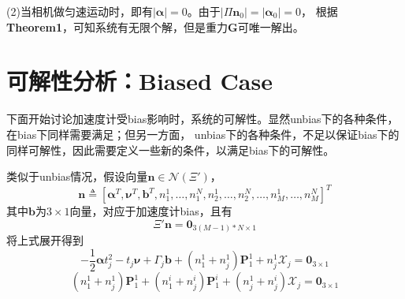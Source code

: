 \documentclass{article}
\begin{document}
\par
(2)当相机做匀速运动时，即有$|\mathbf{\alpha}|=0$。由于$|\Pi\textbf{n}_0|=|\mathbf{\alpha}_0|=0$，
根据\textbf{Theorem1}，可知系统有无限个解，但是重力$\textbf{G}$可唯一解出。

\newpage
\section{可解性分析：Biased Case}
下面开始讨论加速度计受bias影响时，系统的可解性。显然unbias下的各种条件，在bias下同样需要满足；但另一方面，
unbias下的各种条件，不足以保证bias下的同样可解性，因此需要定义一些新的条件，以满足bias下的可解性。
\par
类似于unbias情况，假设向量$\textbf{n}\in\mathcal{N}(\Xi')$，
\begin{equation}\label{eqs:zeroSpace1}
    \textbf{n}\triangleq \left[\mathbf{\alpha}^T,\mathbf{\nu}^T,\textbf{b}^T,n_1^1,\dots,n_1^N,
    n_2^1,\dots,n_2^N,\dots,n_M^1,\dots,n_M^N\right]^T
\end{equation}
其中$\textbf{b}$为$3\times 1$向量，对应于加速度计bias，且有
\begin{equation}\label{eqs:bias1}
    \Xi'\textbf{n}=\textbf{0}_{3(M-1)*N\times 1}
\end{equation}
将上式展开得到
\begin{equation}\label{eqs:bias1_1}
    -\frac{1}{2}\mathbf{\alpha}t_j^2-t_j\mathbf{\nu}+\Gamma_j\textbf{b}
    +(n_1^1+n_j^1)\textbf{P}_1^1+n_j^1\mathcal{X}_j=\textbf{0}_{3\times 1}
\end{equation}
\begin{equation}\label{eqs:bias1_2}
    (n_1^1+n_j^1)\textbf{P}_1^1+(n_1^i+n_j^i)\textbf{P}_1^i+(n_j^1+n_j^i)\mathcal{X}_j=\textbf{0}_{3\times 1}
\end{equation}
\end{document}
